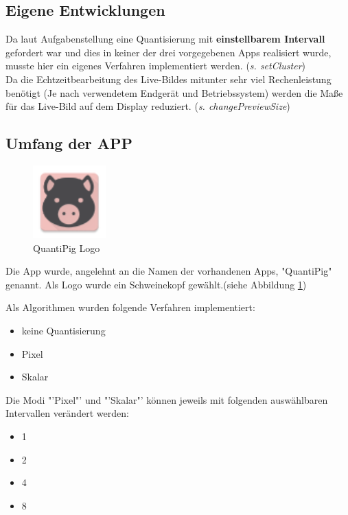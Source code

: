 \begin{description}
\subsection{Eigene Entwicklungen}

Da laut Aufgabenstellung eine Quantisierung mit \textbf{einstellbarem Intervall} gefordert war und dies in keiner der drei vorgegebenen Apps realisiert wurde, musste hier ein eigenes Verfahren implementiert werden. (\textit{s. setCluster})\\
Da die Echtzeitbearbeitung des Live-Bildes mitunter sehr viel Rechenleistung benötigt (Je nach verwendetem Endgerät und Betriebssystem) werden die Maße für das Live-Bild auf dem Display reduziert.
(\textit{s. changePreviewSize})\\



\subsection{Umfang der APP}

\begin{figure}[h]
	\centering
		\includegraphics[width=0.25\textwidth]{img/ic_launcher.png}
	\caption[QuantiPig Logo]{QuantiPig Logo}
	\label{fig:pig_logo}
\end{figure}

Die App wurde, angelehnt an die Namen der vorhandenen Apps, "QuantiPig" genannt. Als Logo wurde ein Schweinekopf gewählt.(siehe Abbildung \ref{fig:pig_logo})

Als Algorithmen wurden folgende Verfahren implementiert:

\begin{itemize}
	\item keine Quantisierung
	\item Pixel  
	\item Skalar
\end{itemize}

Die Modi "'Pixel"' und "'Skalar"' können jeweils mit folgenden auswählbaren Intervallen verändert werden:
\begin{itemize}
	\item 1
	\item 2
	\item 4
	\item 8
\end{itemize}



\end{description}
